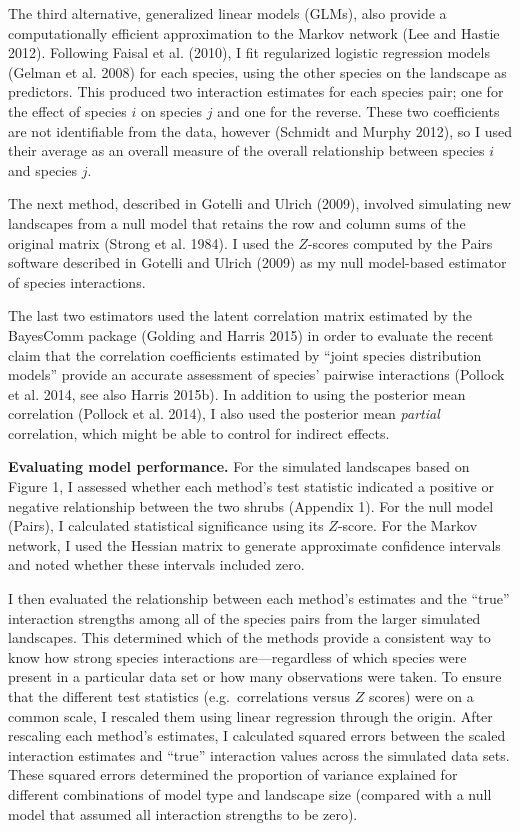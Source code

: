 \documentclass[12pt,]{article}
\begin{document}
\begin{spacing}{1.9}
\begin{flushleft}
The third alternative, generalized linear models (GLMs), also provide a
computationally efficient approximation to the Markov network (Lee and
Hastie 2012). Following Faisal et al. (2010), I fit regularized logistic
regression models (Gelman et al. 2008) for each species, using the other
species on the landscape as predictors. This produced two interaction
estimates for each species pair; one for the effect of species \(i\) on
species \(j\) and one for the reverse. These two coefficients are not
identifiable from the data, however (Schmidt and Murphy 2012), so I used
their average as an overall measure of the overall relationship between
species \(i\) and species \(j\).

The next method, described in Gotelli and Ulrich (2009), involved
simulating new landscapes from a null model that retains the row and
column sums of the original matrix (Strong et al. 1984). I used the
\(Z\)-scores computed by the Pairs software described in Gotelli and
Ulrich (2009) as my null model-based estimator of species interactions.

The last two estimators used the latent correlation matrix estimated by
the BayesComm package (Golding and Harris 2015) in order to evaluate the
recent claim that the correlation coefficients estimated by ``joint
species distribution models'' provide an accurate assessment of species'
pairwise interactions (Pollock et al. 2014, see also Harris 2015b). In
addition to using the posterior mean correlation (Pollock et al. 2014),
I also used the posterior mean \emph{partial} correlation, which might
be able to control for indirect effects.

\noindent \textbf{Evaluating model performance.} For the simulated
landscapes based on Figure 1, I assessed whether each method's test
statistic indicated a positive or negative relationship between the two
shrubs (Appendix 1). For the null model (Pairs), I calculated
statistical significance using its \(Z\)-score. For the Markov network,
I used the Hessian matrix to generate approximate confidence intervals
and noted whether these intervals included zero.

I then evaluated the relationship between each method's estimates and
the ``true'' interaction strengths among all of the species pairs from
the larger simulated landscapes. This determined which of the methods
provide a consistent way to know how strong species interactions
are---regardless of which species were present in a particular data set
or how many observations were taken. To ensure that the different test
statistics (e.g.~correlations versus \(Z\) scores) were on a common
scale, I rescaled them using linear regression through the origin. After
rescaling each method's estimates, I calculated squared errors between
the scaled interaction estimates and ``true'' interaction values across
the simulated data sets. These squared errors determined the proportion
of variance explained for different combinations of model type and
landscape size (compared with a null model that assumed all interaction
strengths to be zero).


\end{flushleft}
\end{spacing}
\end{document}
